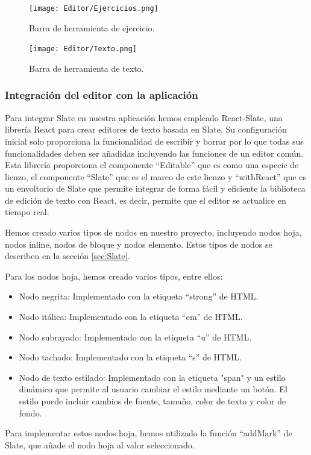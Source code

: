 \begin{figure}[h!]
  \centering
  \texttt{[image: Editor/Ejercicios.png]}
  \caption{Barra de herramienta de ejercicio.}
  \label{fig:barrraHerramientaEjercicios}
\end{figure}

\begin{figure}[h!]
  \centering
  \texttt{[image: Editor/Texto.png]}
  \caption{Barra de herramienta de texto.}
  \label{fig:barrraHerramientaTexto}
\end{figure}

\subsubsection{Integración del editor con la aplicación}
Para integrar Slate en nuestra aplicación hemos empleado React-Slate, una librería React para crear editores de texto basada en Slate. Su configuración inicial solo proporciona la funcionalidad de escribir y borrar por lo que todas sus funcionalidades deben ser añadidas incluyendo las funciones de un editor común. Esta librería proporciona el componente ``Editable'' que es como una especie de lienzo,  el componente ``Slate'' que es el marco de este lienzo y ``withReact'' que es un envoltorio de Slate que permite integrar de forma fácil y eficiente la biblioteca de edición de texto con React, es decir, permite que el editor se actualice en tiempo real.

Hemos creado varios tipos de nodos en nuestro proyecto, incluyendo nodos hoja, nodos inline, nodos de bloque y nodos elemento. Estos tipos de nodos se describen en la sección \ref{sec:Slate}.

Para los nodos hoja, hemos creado varios tipos, entre ellos:

\begin{itemize}
  \item Nodo negrita: Implementado con la etiqueta ``strong'' de HTML.
  \item Nodo itálica: Implementado con la etiqueta ``em'' de HTML.
  \item Nodo subrayado: Implementado con la etiqueta ``u'' de HTML.
  \item Nodo tachado: Implementado con la etiqueta ``s'' de HTML.
  \item Nodo de texto estilado: Implementado con la etiqueta "span" y un estilo dinámico que permite al usuario cambiar el estilo mediante un botón. El estilo puede incluir cambios de fuente, tamaño, color de texto y color de fondo.
\end{itemize}
Para implementar estos nodos hoja, hemos utilizado la función ``addMark'' de Slate, que añade el nodo hoja al valor seleccionado.


